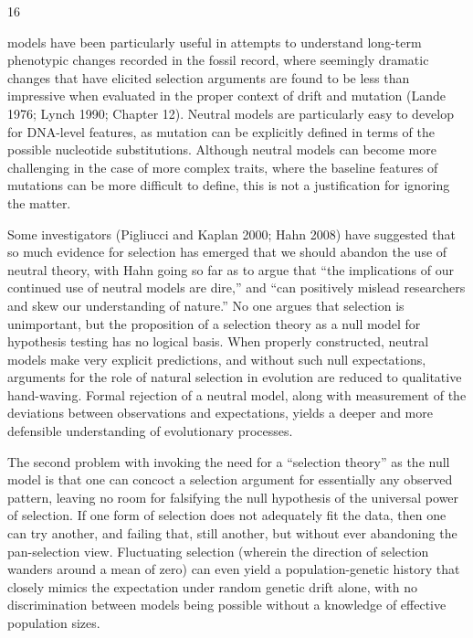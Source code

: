 \documentclass{article}
\begin{document}
16

models have been particularly useful in attempts to understand long-term phenotypic changes recorded in the fossil record, where seemingly dramatic changes that have elicited selection arguments are found to be less than impressive when evaluated in the proper context of drift and mutation (Lande 1976; Lynch 1990; Chapter 12). Neutral models are particularly easy to develop for DNA-level features, as mutation can be explicitly defined in terms of the possible nucleotide substitutions. Although neutral models can become more challenging in the case of more complex traits, where the baseline features of mutations can be more difficult to define, this is not a justification for ignoring the matter.

Some investigators (Pigliucci and Kaplan 2000; Hahn 2008) have suggested that so much evidence for selection has emerged that we should abandon the use of neutral theory, with Hahn going so far as to argue that “the implications of our continued use of neutral models are dire,” and “can positively mislead researchers and skew our understanding of nature.” No one argues that selection is unimportant, but the proposition of a selection theory as a null model for hypothesis testing has no logical basis. When properly constructed, neutral models make very explicit predictions, and without such null expectations, arguments for the role of natural selection in evolution are reduced to qualitative hand-waving. Formal rejection of a neutral model, along with measurement of the deviations between observations and expectations, yields a deeper and more defensible understanding of evolutionary processes.

The second problem with invoking the need for a “selection theory” as the null model is that one can concoct a selection argument for essentially any observed pattern, leaving no room for falsifying the null hypothesis of the universal power of selection. If one form of selection does not adequately fit the data, then one can try another, and failing that, still another, but without ever abandoning the pan-selection view. Fluctuating selection (wherein the direction of selection wanders around a mean of zero) can even yield a population-genetic history that closely mimics the expectation under random genetic drift alone, with no discrimination between models being possible without a knowledge of effective population sizes.
\end{document}
